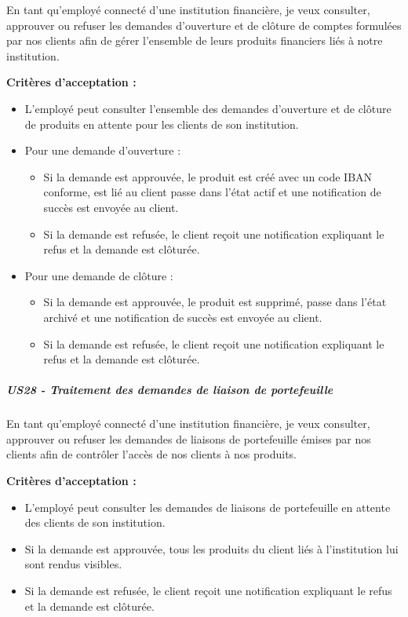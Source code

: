 En tant qu'employé connecté d'une institution financière, je veux
consulter, approuver ou refuser les demandes d'ouverture et de clôture
de comptes formulées par nos clients afin de gérer l'ensemble de leurs
produits financiers liés à notre institution.

\textbf{Critères d'acceptation :}

\begin{itemize}
\tightlist
\item
  L'employé peut consulter l'ensemble des demandes d'ouverture et de
  clôture de produits en attente pour les clients de son institution.
\item
  Pour une demande d'ouverture :

  \begin{itemize}
  \tightlist
  \item
    Si la demande est approuvée, le produit est créé avec un code IBAN
    conforme, est lié au client passe dans l'état actif et une
    notification de succès est envoyée au client.
  \item
    Si la demande est refusée, le client reçoit une notification
    expliquant le refus et la demande est clôturée.
  \end{itemize}
\item
  Pour une demande de clôture :

  \begin{itemize}
  \tightlist
  \item
    Si la demande est approuvée, le produit est supprimé, passe dans
    l'état archivé et une notification de succès est envoyée au client.
  \item
    Si la demande est refusée, le client reçoit une notification
    expliquant le refus et la demande est clôturée.
  \end{itemize}
\end{itemize}

\hypertarget{us28---traitement-des-demandes-de-liaison-de-portefeuille}{%
\subparagraph{US28 - Traitement des demandes de liaison de
portefeuille}\label{us28---traitement-des-demandes-de-liaison-de-portefeuille}}

En tant qu'employé connecté d'une institution financière, je veux
consulter, approuver ou refuser les demandes de liaisons de portefeuille
émises par nos clients afin de contrôler l'accès de nos clients à nos
produits.

\textbf{Critères d'acceptation :}

\begin{itemize}
\tightlist
\item
  L'employé peut consulter les demandes de liaisons de portefeuille en
  attente des clients de son institution.
\item
  Si la demande est approuvée, tous les produits du client liés à
  l'institution lui sont rendus visibles.
\item
  Si la demande est refusée, le client reçoit une notification
  expliquant le refus et la demande est clôturée.
\end{itemize}

